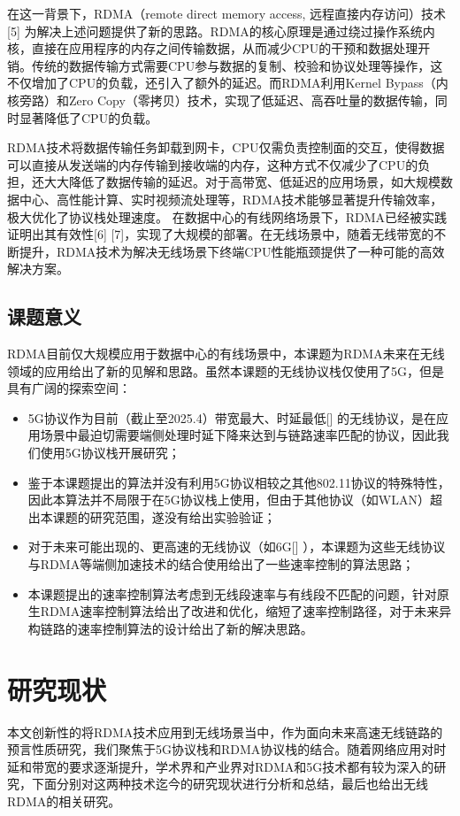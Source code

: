 \documentclass{seuthesis-2022}
\begin{document}
在这一背景下，RDMA（remote direct memory access, 远程直接内存访问）技术[5] 为解决上述问题提供了新的思路。RDMA的核心原理是通过绕过操作系统内核，直接在应用程序的内存之间传输数据，从而减少CPU的干预和数据处理开销。传统的数据传输方式需要CPU参与数据的复制、校验和协议处理等操作，这不仅增加了CPU的负载，还引入了额外的延迟。而RDMA利用Kernel Bypass（内核旁路）和Zero Copy（零拷贝）技术，实现了低延迟、高吞吐量的数据传输，同时显著降低了CPU的负载。

RDMA技术将数据传输任务卸载到网卡，CPU仅需负责控制面的交互，使得数据可以直接从发送端的内存传输到接收端的内存，这种方式不仅减少了CPU的负担，还大大降低了数据传输的延迟。对于高带宽、低延迟的应用场景，如大规模数据中心、高性能计算、实时视频流处理等，RDMA技术能够显著提升传输效率，极大优化了协议栈处理速度。
在数据中心的有线网络场景下，RDMA已经被实践证明出其有效性[6] [7]，实现了大规模的部署。在无线场景中，随着无线带宽的不断提升，RDMA技术为解决无线场景下终端CPU性能瓶颈提供了一种可能的高效解决方案。

\subsection{课题意义} 
RDMA目前仅大规模应用于数据中心的有线场景中，本课题为RDMA未来在无线领域的应用给出了新的见解和思路。虽然本课题的无线协议栈仅使用了5G，但是具有广阔的探索空间：
\begin{itemize}
    \item 5G协议作为目前（截止至2025.4）带宽最大、时延最低[] 的无线协议，是在应用场景中最迫切需要端侧处理时延下降来达到与链路速率匹配的协议，因此我们使用5G协议栈开展研究；
    \item 鉴于本课题提出的算法并没有利用5G协议相较之其他802.11协议的特殊特性，因此本算法并不局限于在5G协议栈上使用，但由于其他协议（如WLAN）超出本课题的研究范围，遂没有给出实验验证；
    \item 对于未来可能出现的、更高速的无线协议（如6G[] ），本课题为这些无线协议与RDMA等端侧加速技术的结合使用给出了一些速率控制的算法思路；
    \item 本课题提出的速率控制算法考虑到无线段速率与有线段不匹配的问题，针对原生RDMA速率控制算法给出了改进和优化，缩短了速率控制路径，对于未来异构链路的速率控制算法的设计给出了新的解决思路。
\end{itemize}

\section{研究现状}
本文创新性的将RDMA技术应用到无线场景当中，作为面向未来高速无线链路的预言性质研究，我们聚焦于5G协议栈和RDMA协议栈的结合。随着网络应用对时延和带宽的要求逐渐提升，学术界和产业界对RDMA和5G技术都有较为深入的研究，下面分别对这两种技术迄今的研究现状进行分析和总结，最后也给出无线RDMA的相关研究。
\end{document}

